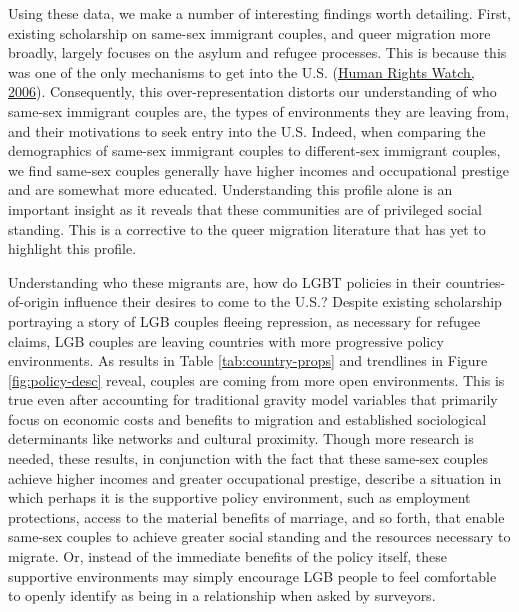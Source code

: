 \documentclass[
  11pt,
]{article}
\begin{document}
Using these data, we make a number of interesting findings worth detailing. First, existing scholarship on same-sex immigrant couples, and queer migration more broadly, largely focuses on the asylum and refugee processes. This is because this was one of the only mechanisms to get into the U.S. (\protect\hyperlink{ref-humanrightswatch_2006}{Human Rights Watch, 2006}). Consequently, this over-representation distorts our understanding of who same-sex immigrant couples are, the types of environments they are leaving from, and their motivations to seek entry into the U.S. Indeed, when comparing the demographics of same-sex immigrant couples to different-sex immigrant couples, we find same-sex couples generally have higher incomes and occupational prestige and are somewhat more educated. Understanding this profile alone is an important insight as it reveals that these communities are of privileged social standing. This is a corrective to the queer migration literature that has yet to highlight this profile.

Understanding who these migrants are, how do LGBT policies in their countries-of-origin influence their desires to come to the U.S.? Despite existing scholarship portraying a story of LGB couples fleeing repression, as necessary for refugee claims, LGB couples are leaving countries with more progressive policy environments. As results in Table \ref{tab:country-props} and trendlines in Figure \ref{fig:policy-desc} reveal, couples are coming from more open environments. This is true even after accounting for traditional gravity model variables that primarily focus on economic costs and benefits to migration and established sociological determinants like networks and cultural proximity. Though more research is needed, these results, in conjunction with the fact that these same-sex couples achieve higher incomes and greater occupational prestige, describe a situation in which perhaps it is the supportive policy environment, such as employment protections, access to the material benefits of marriage, and so forth, that enable same-sex couples to achieve greater social standing and the resources necessary to migrate. Or, instead of the immediate benefits of the policy itself, these supportive environments may simply encourage LGB people to feel comfortable to openly identify as being in a relationship when asked by surveyors.
\end{document}
